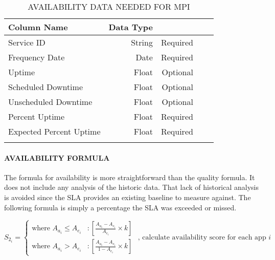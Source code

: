 \documentclass[SDSUThesis.tex]{subfiles}
\begin{document}
            
                \begin{longtable}{@{}l rr rr}
                    \toprule%
                     \centering%
                     {\bfseries Column Name}
                     & {\bfseries Data Type}
                     &  \\
                    
                    \cmidrule[0.4pt](r{0.125em}){1-1}%
                    \cmidrule[0.4pt](lr{0.125em}){2-2}%
                    \cmidrule[0.4pt](l{0.125em}){3-3}%
                    \endhead
                    
                    Service ID & String  & Required \\
                    \myrowcolour%
                    Frequency Date & Date & Required \\
                    Uptime & Float & Optional \\
                    \myrowcolour%
                    Scheduled Downtime & Float & Optional \\
                    Unscheduled Downtime & Float  & Optional \\
                    \myrowcolour%
                    Percent Uptime & Float & Required \\
                    Expected Percent Uptime & Float & Required \\
                    
                    \bottomrule
                    
                    \caption{AVAILABILITY DATA NEEDED FOR MPI}
                    \label{tab:availdata}
                \end{longtable}
            
            \paragraph{AVAILABILITY FORMULA}
                The formula for availability is more straightforward than the quality formula.
                It does not include any analysis of the historic data.  That lack of historical
                analysis is avoided since the SLA provides an existing baseline to measure 
                against.  The following formula is simply a percentage the SLA was exceeded
                or missed. 
                
                \begin{displaymath}
                   S_{2_i} = \left\{
                     \begin{array}{lr}
                       \text{where } A_{a_i} \leq A_{e_i} & : \left[ \frac{A_{a_i} - A_{e_i}}{A_{e_i}}\times k \right] \\
                       \text{where } A_{a_i} > A_{e_i}  & : \left[ \frac{A_{a_i} - A_{e_i} }{1-A_{e_i}}\times k \right]
                     \end{array}
                   \right. \text{   , calculate availability score for each app $i$}
                \end{displaymath}
                
\end{document}
